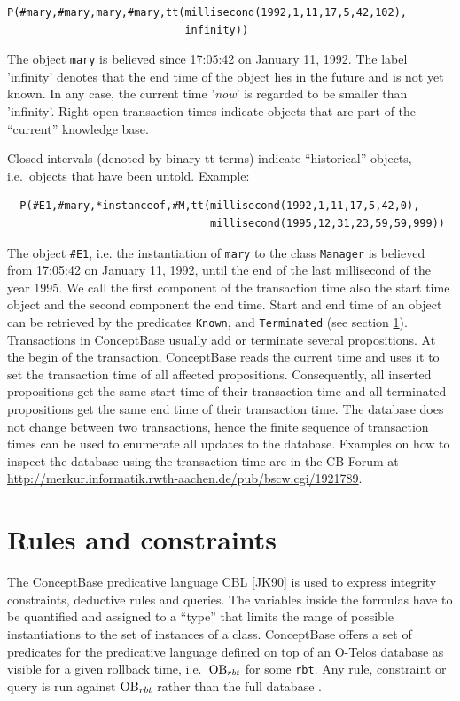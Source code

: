 \begin{verbatim}
P(#mary,#mary,mary,#mary,tt(millisecond(1992,1,11,17,5,42,102),
                            infinity))
\end{verbatim}


The object {\tt mary} is believed since 17:05:42 on January 11, 1992. The
label 'infinity' denotes that the end time of the object lies in the
future and is not yet known. In any case, the current time '{\it now}' is regarded
to be smaller than 'infinity'.
Right-open transaction times indicate objects that are part of the ``current'' knowledge base.

Closed intervals (denoted by binary tt-terms) indicate ``historical'' objects, i.e.\
objects that have been untold.
Example:

\begin{verbatim}
  P(#E1,#mary,*instanceof,#M,tt(millisecond(1992,1,11,17,5,42,0),
                                millisecond(1995,12,31,23,59,59,999))
\end{verbatim}

The object {\tt \#E1}, i.e. the instantiation  of {\tt mary} to the class {\tt Manager}
is believed from 17:05:42 on January 11, 1992, until the end of the last millisecond
of the year 1995. We call the first component of the transaction time also the start time
object and the second component the end time.
Start and end time of an object can be retrieved by the predicates {\tt Known},
and {\tt Terminated} (see section \ref{sec:CBL}).
Transactions in ConceptBase usually add or terminate several propositions. At the begin
of the transaction, ConceptBase reads the current time and uses it to set
the transaction time of all affected propositions. Consequently, all inserted propositions get
the same start time of their transaction time and all terminated propositions
get the same end time of their transaction time. The database does not change between two transactions,
hence the finite sequence of transaction times can be used to enumerate all updates
to the database. Examples on how to inspect the database using the transaction time are in
the CB-Forum at \url{http://merkur.informatik.rwth-aachen.de/pub/bscw.cgi/1921789}.




\section{Rules and constraints}
\label{sec:CBL}

The ConceptBase predicative language CBL [JK90] is used to express
integrity constraints, deductive rules and queries. The variables inside
the formulas have to be quantified and assigned to a ``type'' that limits the
range of possible instantiations to the set of instances of a class.
ConceptBase offers a set of predicates for the predicative language defined
on top of an O-Telos database as visible for a given rollback time,
i.e.\  $\hbox{\rm OB}_{rbt}$ for some {\tt rbt}. Any rule, constraint or
query is run against $\hbox{\rm OB}_{rbt}$ rather than the full database {\OB}.



